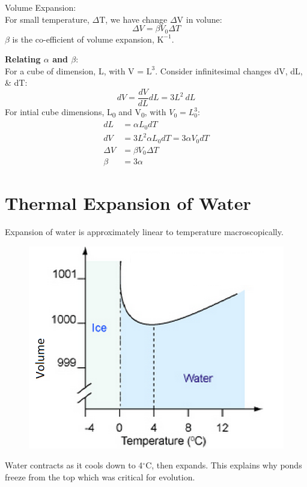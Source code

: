 \documentclass[a4paper, 11pt, normalem]{report}
\begin{document}
Volume Expansion:\\
For small temperature, $\Delta$T, we have change $\Delta$V in volune:
\begin{equation}
    {\Delta}V = {\beta}V_{0}{\Delta}T
\end{equation}
$\beta$ is the co-efficient of volume expansion, $\text{K}^{-1}$.

\textbf{Relating ${\alpha}$ and ${\beta}$}:\\
For a cube of dimension, L, with V = $\text{L}^{3}$.
Consider infinitesimal changes dV, dL, \& dT:
\begin{equation}
	dV = \dfrac{dV}{dL}dL = 3L^{2}~dL
\end{equation}
For intial cube dimensions, L\textsubscript{0} and V\textsubscript{0}, with $V_{0} = L_{0}^{3}$:
\begin{align}
    dL &= {\alpha}L_{0}dT \\
    dV &= 3L^{2}{\alpha}L_{0}dT = 3{\alpha}V_{0}dT \\
    {\Delta}V &= {\beta}V_{0}{\Delta}T \\
    \beta &= 3\alpha
\end{align}

\section{Thermal Expansion of Water}
Expansion of water is approximately linear to temperature macroscopically.
\begin{figure}[H]
    \centering
    \includegraphics[scale=0.4]{water.png}
\end{figure}
Water contracts as it cools down to 4{$^\circ$}C, then expands. 
This explains why ponds freeze from the top which was critical for evolution.
\end{document}
